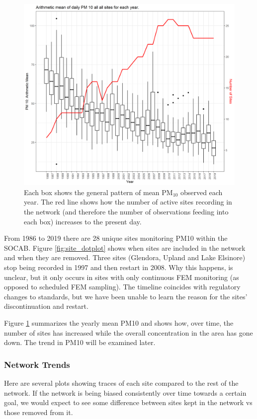 \documentclass{article}
\begin{document}
\begin{figure}[ht]
    \centering
    \includegraphics[width = \textwidth]{Figures/site_trend-ArthmM_NumSites.png}
    \caption{Each box shows the general pattern of mean 
    PM$_{10}$
    observed each year.  The red line shows how the number of active sites recording in the network (and therefore the number of observations feeding into each box) increases to the present day.}
    \label{fig:site_trend-ArthmM_NumSites}
\end{figure} 

From 1986 to 2019 there are 28 unique sites monitoring \ac{PM10} within the \ac{SOCAB}. Figure \ref{fig:site_dotplot} shows when sites are included in the network and when they are removed.   Three sites (Glendora, Upland and Lake Elsinore) stop being recorded in 1997 and then restart in 2008. Why this happens, is unclear, but it only occurs in sites with only continuous \ac{FEM} monitoring (as opposed to scheduled \ac{FEM} sampling).  The timeline coincides with regulatory changes to standards, but we have been unable to learn the reason for the sites' discontinuation and restart.

Figure \ref{fig:site_trend-ArthmM_NumSites} summarizes the yearly mean \ac{PM10} and shows how, over time, the number of sites has increased while the overall concentration in the area has gone down. The trend in \ac{PM10} will be examined later. 

\subsubsection*{Network Trends}
\label{subsubsec:networktrends}
Here are several plots showing traces of each site compared to the rest of the network.  If the network is being biased consistently over time towards a certain goal, we would expect to see some difference between sites kept in the network vs those removed from it.  
\end{document}

